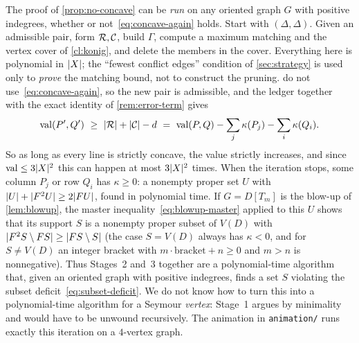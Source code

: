 \begin{remark}\label{rem:algorithm}
The proof of \cref{prop:no-concave} can be \emph{run} on any oriented graph
$G$ with positive indegrees, whether or not~\eqref{eq:concave-again} holds.
Start with $(\Delta,\Delta)$. Given an admissible pair, form $\mathcal R,\mathcal C$,
build $\Gamma$, compute a maximum matching and the vertex cover of
\cref{cl:konig}, and delete the members in the cover. Everything here is
polynomial in $\lvert X\rvert$; the ``fewest conflict edges'' condition of
\cref{sec:strategy} is used only to \emph{prove} the matching bound, not
to construct the pruning.
 do
not use~\eqref{eq:concave-again}, so the new pair is admissible, and the
ledger together with the exact identity of \cref{rem:error-term} gives
\[
 \val(P',Q')\ \ge\ \abs\Rf+\abs\Cf-d\ =\ \val(P,Q)-\sum_j\kappa(P_j)-\sum_i\kappa(Q_i).
\]
So as long as every line is strictly concave, the value strictly increases,
and since $\operatorname{val}\le3\lvert X\rvert^2$ this can happen at most $3\lvert X\rvert^2$ times.
When the iteration stops, some column $P_j$ or row $Q_i$ has $\kappa\ge0$:
a nonempty proper set $U$ with $\lvert U\rvert+\lvert F^2U\rvert\ge2\lvert FU\rvert$, found in
polynomial time. If $G=D[T_m]$ is the blow-up of \cref{lem:blowup}, the
master inequality~\eqref{eq:blowup-master} applied to this $U$ shows that
its support $S$ is a nonempty proper subset of $V(D)$ with
$\lvert F^2S\setminus FS\rvert\ge\lvert FS\setminus S\rvert$ (the case $S=V(D)$ always
has $\kappa<0$, and for $S\ne V(D)$ an integer bracket with
$m\cdot\text{bracket}+n\ge0$ and $m>n$ is nonnegative). Thus Stages~2
and~3 together are a polynomial-time algorithm that, given an oriented
graph with positive indegrees, finds a set $S$ violating the subset
deficit~\eqref{eq:subset-deficit}. We do not know how to turn this into a
polynomial-time algorithm for a Seymour \emph{vertex}: Stage~1 argues by
minimality and would have to be unwound recursively. The animation in
\texttt{animation/} runs exactly this iteration on a $4$-vertex graph.
\end{remark}
